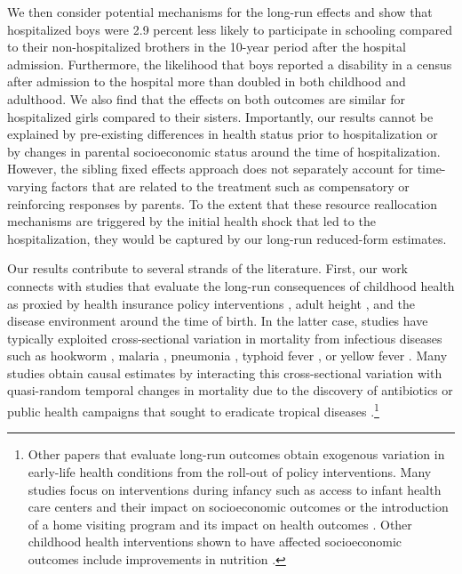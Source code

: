 \documentclass[12pt,english]{article}
\begin{document}
We then consider potential mechanisms for the long-run effects and show that hospitalized boys were 2.9 percent less likely to participate in schooling compared to their non-hospitalized brothers in the 10-year period after the hospital admission. Furthermore, the likelihood that boys reported a disability in a census after admission to the hospital more than doubled in both childhood and adulthood. We also find that the effects on both outcomes are similar for hospitalized girls compared to their sisters. Importantly, our results cannot be explained by pre-existing differences in health status prior to hospitalization or by changes in parental socioeconomic status around the time of hospitalization. However, the sibling fixed effects approach does not separately account for time-varying factors that are related to the treatment such as compensatory or reinforcing responses by parents. To the extent that these resource reallocation mechanisms are triggered by the initial health shock that led to the hospitalization, they would be captured by our long-run reduced-form estimates. 

Our results contribute to several strands of the literature. First, our work connects with studies that evaluate the long-run consequences of childhood health as proxied by health insurance policy interventions \citep{BrownKowalskiLurie2019,GoodmanBacon2017}, adult height \citep{CasePaxson2008}, and the disease environment around the time of birth. In the latter case, studies have typically exploited cross-sectional variation in mortality from infectious diseases such as hookworm \citep{Bleakley2007}, malaria \citep{Barreca2010,Venkataramani2012,Hong2013}, pneumonia \citep{Bhalotra2012}, typhoid fever \citep{Beach-etal2016}, or yellow fever \citep{Saavedra2017}. Many studies obtain causal estimates by interacting this cross-sectional variation with quasi-random temporal changes in mortality due to the discovery of antibiotics \citep{Bhalotra2012,Lazuka2019} or public health campaigns that sought to eradicate tropical diseases \citep{Bleakley2007,Bleakley2010a,Venkataramani2012,Baird2016}.\footnote{Other papers that evaluate long-run outcomes obtain exogenous variation in early-life health conditions from the roll-out of policy interventions. Many studies focus on interventions during infancy such as access to infant health care centers and their impact on socioeconomic outcomes \citep{ButikoferLokenSalvanes2018} or the introduction of a home visiting program and its impact on health outcomes \citep{Hjort2017}. Other childhood health interventions shown to have affected socioeconomic outcomes include improvements in nutrition \citep{Adhvaryu-etal2019}.} 
\end{document}
